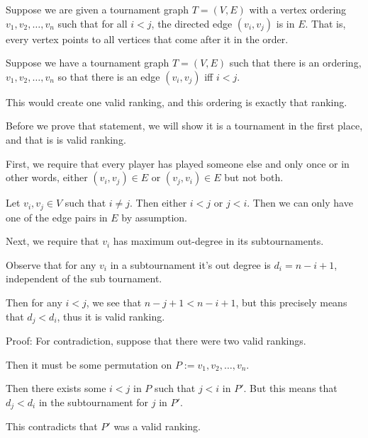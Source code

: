 \begin{soln}
	Suppose we are given a tournament graph \(T = (V, E)\) with a vertex ordering \(v_1, v_2, \dots, v_n\) such that for all \(i < j\), the directed edge \((v_i, v_j)\) is in \(E\). That is, every vertex points to all vertices that come after it in the order.

	Suppose we have a tournament graph \(T = (V, E)\) such that there is an ordering, \(v_1, v_2, \dots, v_n\) so that there is an edge \((v_i, v_j)\) iff \(i < j\).

	This would create one valid ranking, and this ordering is exactly that ranking.

	Before we prove that statement, we will show it is a tournament in the first place, and that is is valid ranking.

	First, we require that every player has played someone else and only once or in other words, either \((v_i, v_j) \in E\) or \((v_j, v_i) \in E\) but not both.

	Let \(v_i, v_j \in V\) such that \(i \neq j\). Then either \(i < j\) or \(j < i\). Then we can only have one of the edge pairs in \(E\) by assumption.

	Next, we require that \(v_i\) has maximum out-degree in its subtournaments.

	Observe that for any \(v_i\) in a subtournament it's out degree is \(d_i = n - i + 1\), independent of the sub tournament.

	Then for any \(i < j\), we see that \(n - j + 1 < n - i + 1\), but this precisely means that \(d_j < d_i\), thus it is valid ranking.

	Proof: For contradiction, suppose that there were two valid rankings.

	Then it must be some permutation on \(P:= v_1, v_2, \dots, v_n\).

	Then there exists some \(i < j\) in \(P\) such that \(j < i\) in \(P'\). But this means that \(d_j < d_i\) in the subtournament for \(j\) in \(P'\).

	This contradicts that \(P'\) was a valid ranking.
\end{soln}
